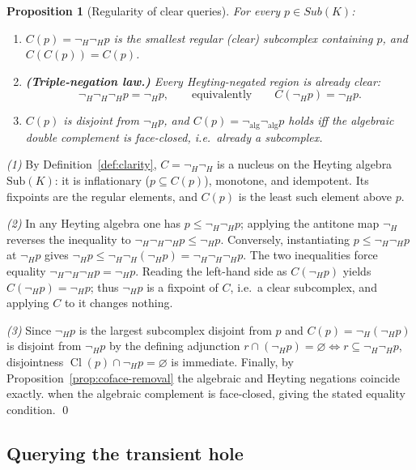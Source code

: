 \documentclass[final,12pt]{elsarticle}
\theoremstyle{plain}
\newtheorem{prop}[thm]{Proposition}
\theoremstyle{definition}
\begin{document}
\begin{prop}[Regularity of clear queries]
\label{prop:clarity-regular}
For every $p\in Sub(K)$:
\begin{enumerate}
  \item $C(p)=\neg_H\neg_H p$ is the smallest regular (clear) subcomplex
        containing $p$, and $C(C(p))=C(p)$.
  \item \textbf{(Triple-negation law.)} Every Heyting-negated region is
        already clear:
        \[
        \neg_H\neg_H\neg_H p=\neg_H p,
        \qquad\text{equivalently}\qquad
        C(\neg_H p)=\neg_H p .
        \]
  \item $C(p)$ is disjoint from $\neg_H p$, and $C(p)=\neg_{\mathrm{alg}}
        \neg_{\mathrm{alg}}p$ holds iff the algebraic double complement
        is face-closed, i.e.\ already a subcomplex.
\end{enumerate}
\end{prop}

\proof
\emph{(1)} By Definition~\ref{def:clarity}, $C=\neg_H\neg_H$ is a nucleus
on the Heyting algebra $\mathrm{Sub}(K)$: it is inflationary ($p\subseteq C(p)$),
monotone, and idempotent. Its fixpoints are the regular elements, and
$C(p)$ is the least such element above $p$.

\emph{(2)} In any Heyting algebra one has $p\le\neg_H\neg_H p$; applying
the antitone map $\neg_H$ reverses the inequality to
$\neg_H\neg_H\neg_H p\le\neg_H p$. Conversely, instantiating
$p\le\neg_H\neg_H p$ at $\neg_H p$ gives
$\neg_H p\le\neg_H\neg_H(\neg_H p)=\neg_H\neg_H\neg_H p$. The two
inequalities force equality $\neg_H\neg_H\neg_H p=\neg_H p$. Reading the
left-hand side as $C(\neg_H p)$ yields $C(\neg_H p)=\neg_H p$; thus
$\neg_H p$ is a fixpoint of $C$, i.e.\ a clear subcomplex, and applying
$C$ to it changes nothing.

\emph{(3)} Since $\neg_H p$ is the largest subcomplex disjoint from $p$
and $C(p)=\neg_H(\neg_H p)$ is disjoint from $\neg_H p$ by the defining
adjunction $r\cap(\neg_H p)=\varnothing\iff r\subseteq\neg_H\neg_H p$,
disjointness \(\mathop{\mathrm{Cl}}(p)\cap\neg_H p=\varnothing\) is immediate. Finally, by
Proposition~\ref{prop:coface-removal} the algebraic and Heyting negations coincide exactly.
when the algebraic complement is face-closed, giving the stated
equality condition.
\qed

\subsection{Querying the transient hole}
\end{document}
